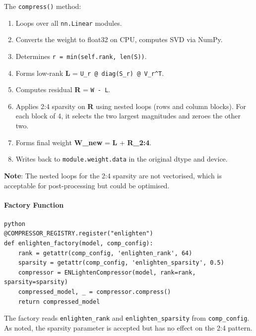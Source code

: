 The \texttt{compress()} method:

\begin{enumerate}
\item Loops over all \texttt{nn.Linear} modules.
\item Converts the weight to float32 on CPU, computes SVD via NumPy.
\item Determines \texttt{r = min(self.rank, len(S))}.
\item Forms low-rank \textbf{L} = \texttt{U\_r @ diag(S\_r) @ V\_r\textasciicircum{}T}.
\item Computes residual \textbf{R} = \texttt{W - L}.
\item Applies 2:4 sparsity on \textbf{R} using nested loops (rows and column blocks). For each block of 4, it selects the two largest magnitudes and zeroes the other two.
\item Forms final weight \textbf{W\_new} = \textbf{L} + \textbf{R\_2:4}.
\item Writes back to \texttt{module.weight.data} in the original dtype and device.

\end{enumerate}
\textbf{Note}: The nested loops for the 2:4 sparsity are not vectorised, which is acceptable for post-processing but could be optimised.

\paragraph{Factory Function}

\vspace{0.5em}
\begin{mdframed}[backgroundcolor=codebg, linecolor=codeframe, linewidth=1pt, roundcorner=4pt, innerleftmargin=2pt, innerrightmargin=5pt, innertopmargin=5pt, innerbottommargin=5pt]
\begin{lstlisting}
python
@COMPRESSOR_REGISTRY.register("enlighten")
def enlighten_factory(model, comp_config):
    rank = getattr(comp_config, 'enlighten_rank', 64)
    sparsity = getattr(comp_config, 'enlighten_sparsity', 0.5)
    compressor = ENLightenCompressor(model, rank=rank, sparsity=sparsity)
    compressed_model, _ = compressor.compress()
    return compressed_model
\end{lstlisting}
\end{mdframed}
\vspace{0.5em}

The factory reads \texttt{enlighten\_rank} and \texttt{enlighten\_sparsity} from \texttt{comp\_config}. As noted, the sparsity parameter is accepted but has no effect on the 2:4 pattern.


